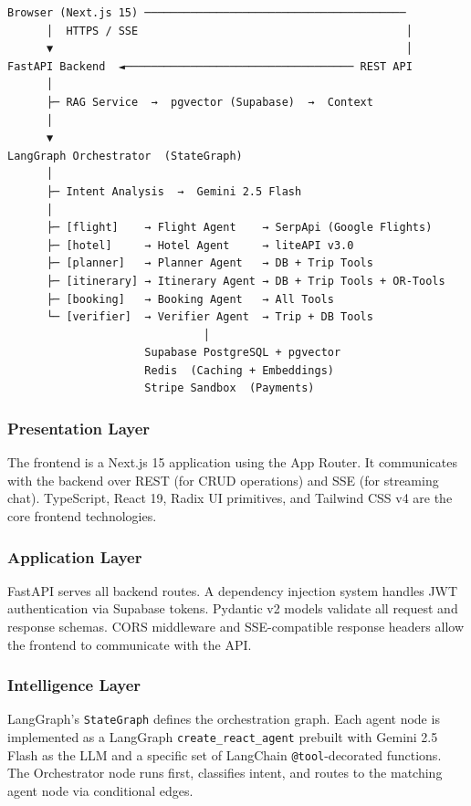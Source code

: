 \documentclass[12pt, a4paper]{article}
\begin{document}
\begin{archbox}
\begin{verbatim}
Browser (Next.js 15) ────────────────────────────────────────
      │  HTTPS / SSE                                         │
      ▼                                                      │
FastAPI Backend  ◄─────────────────────────────────── REST API
      │
      ├─ RAG Service  →  pgvector (Supabase)  →  Context
      │
      ▼
LangGraph Orchestrator  (StateGraph)
      │
      ├─ Intent Analysis  →  Gemini 2.5 Flash
      │
      ├─ [flight]    → Flight Agent    → SerpApi (Google Flights)
      ├─ [hotel]     → Hotel Agent     → liteAPI v3.0
      ├─ [planner]   → Planner Agent   → DB + Trip Tools
      ├─ [itinerary] → Itinerary Agent → DB + Trip Tools + OR-Tools
      ├─ [booking]   → Booking Agent   → All Tools
      └─ [verifier]  → Verifier Agent  → Trip + DB Tools
                              │
                     Supabase PostgreSQL + pgvector
                     Redis  (Caching + Embeddings)
                     Stripe Sandbox  (Payments)
\end{verbatim}
\end{archbox}

\subsubsection{Presentation Layer}

The frontend is a Next.js 15 application using the App Router. It communicates with the backend over REST (for CRUD operations) and SSE (for streaming chat). TypeScript, React 19, Radix UI primitives, and Tailwind CSS v4 are the core frontend technologies.

\subsubsection{Application Layer}

FastAPI serves all backend routes. A dependency injection system handles JWT authentication via Supabase tokens. Pydantic v2 models validate all request and response schemas. CORS middleware and SSE-compatible response headers allow the frontend to communicate with the API.

\subsubsection{Intelligence Layer}

LangGraph's \texttt{StateGraph} defines the orchestration graph. Each agent node is implemented as a LangGraph \texttt{create\_react\_agent} prebuilt with Gemini 2.5 Flash as the LLM and a specific set of LangChain \texttt{@tool}-decorated functions. The Orchestrator node runs first, classifies intent, and routes to the matching agent node via conditional edges.
\end{document}
